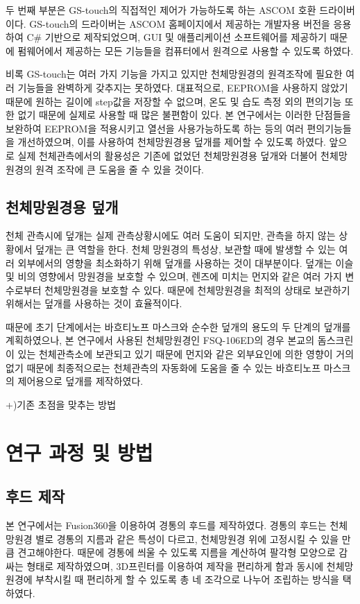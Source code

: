 \documentclass[twoside,11pt]{gshs_thesis}
\begin{document}
두 번째 부분은 GS-touch의 직접적인 제어가 가능하도록 하는 ASCOM 호환 드라이버이다. GS-touch의 드라이버는 ASCOM 홈페이지에서 제공하는 개발자용 버전을 응용하여 C\# 기반으로 제작되었으며, GUI 및 애플리케이션 소프트웨어를 제공하기 때문에 펌웨어에서 제공하는 모든 기능들을 컴퓨터에서 원격으로 사용할 수 있도록 하였다.


비록 GS-touch는 여러 가지 기능을 가지고 있지만 천체망원경의 원격조작에 필요한 여러 기능들을 완벽하게 갖추지는 못하였다. 대표적으로, EEPROM을 사용하지 않았기 때문에 원하는 길이에 step값을 저장할 수 없으며, 온도 및 습도 측정 외의 편의기능 또한 없기 때문에 실제로 사용할 때 많은 불편함이 있다. 본 연구에서는 이러한 단점들을 보완하여 EEPROM을 적용시키고 열선을 사용가능하도록 하는 등의 여러 편의기능들을 개선하였으며, 이를 사용하여 천체망원경용 덮개를 제어할 수 있도록 하였다. 앞으로 실제 천체관측에서의 활용성은 기존에 없었던 천체망원경용 덮개와 더불어 천체망원경의 원격 조작에 큰 도움을 줄 수 있을 것이다.

\subsection{천체망원경용 덮개}

천체 관측시에 덮개는 실제 관측상황시에도 여러 도움이 되지만, 관측을 하지 않는 상황에서 덮개는 큰 역할을 한다. 천체 망원경의 특성상, 보관할 때에 발생할 수 있는 여러 외부에서의 영향을 최소화하기 위해 덮개를 사용하는 것이 대부분이다. 덮개는 이슬 및 비의 영향에서 망원경을 보호할 수 있으며, 렌즈에 미치는 먼지와 같은 여러 가지 변수로부터 천체망원경을 보호할 수 있다. 때문에 천체망원경을 최적의 상태로 보관하기 위해서는 덮개를 사용하는 것이 효율적이다. 

때문에 초기 단계에서는 바흐티노프 마스크와 순수한 덮개의 용도의 두 단계의 덮개를 계획하였으나, 본 연구에서 사용된 천체망원경인 FSQ-106ED의 경우 본교의 돔스크린이 있는 천체관측소에 보관되고 있기 때문에 먼지와 같은 외부요인에 의한 영향이 거의 없기 때문에 최종적으로는 천체관측의 자동화에 도움을 줄 수 있는 바흐티노프 마스크의 제어용으로 덮개를 제작하였다.

+)기존 초점을 맞추는 방법

\newpage
\section{연구 과정 및 방법}
\subsection{후드 제작}
 본 연구에서는 Fusion360을 이용하여 경통의 후드를 제작하였다. 경통의 후드는 천체망원경 별로 경통의 지름과 같은 특성이 다르고, 천체망원경 위에 고정시킬 수 있을 만큼 견고해야한다. 때문에 경통에 씌울 수 있도록 지름을 계산하여 팔각형 모양으로 감싸는 형태로 제작하였으며, 3D프린터를 이용하여 제작을 편리하게 함과 동시에 천체망원경에 부착시킬 때 편리하게 할 수 있도록 총 네 조각으로 나누어 조립하는 방식을 택하였다.
 
\end{document}
